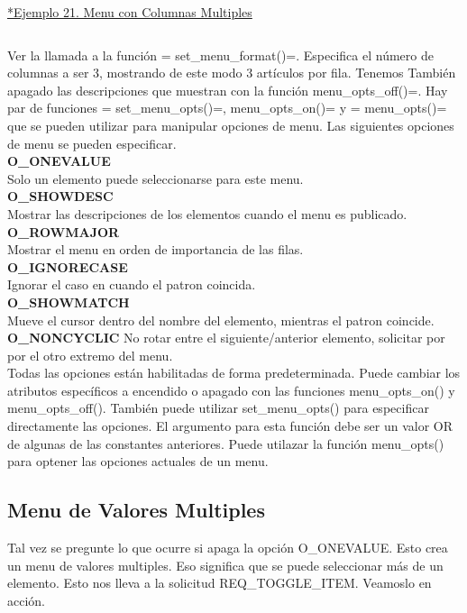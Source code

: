 \documentclass{article}
\begin{document}
\href{https://github.com/nasciiboy/NCURSES-Programming-HOWTO/blob/master/ncurses_programs/menus/menu_multi_column.c}{*Ejemplo 21. Menu con Columnas Multiples}
\inputminted{cpp}{./cpp/021_menu_columnas.cpp}

Ver la llamada a la función = set\_menu\_format()=. Especifica el número de
columnas a ser 3, mostrando de este modo 3 artículos por fila. Tenemos También
apagado las descripciones que muestran con la función menu\_opts\_off()=. Hay par
de funciones = set\_menu\_opts()=, menu\_opts\_on()= y = menu\_opts()= que se pueden
utilizar para manipular opciones de menu. Las siguientes opciones de menu se
pueden especificar.\\

\textbf{O\_ONEVALUE}\\
Solo un elemento puede seleccionarse para este menu.\\

\textbf{O\_SHOWDESC}\\
Mostrar las descripciones de los elementos cuando el menu es publicado.\\

\textbf{O\_ROWMAJOR}\\
Mostrar el menu en orden de importancia de las filas.\\

\textbf{O\_IGNORECASE}\\
Ignorar el caso en cuando el patron coincida.\\

\textbf{O\_SHOWMATCH}\\
Mueve el cursor dentro del nombre del elemento, mientras el patron coincide.\\

\textbf{O\_NONCYCLIC}
No rotar entre el siguiente/anterior elemento, solicitar por por el otro extremo del menu.\\

Todas las opciones están habilitadas de forma predeterminada. Puede cambiar los
atributos específicos a encendido o apagado con las funciones menu\_opts\_on() y
menu\_opts\_off(). También puede utilizar set\_menu\_opts() para especificar
directamente las opciones. El argumento para esta función debe ser un valor OR
de algunas de las constantes anteriores. Puede utilazar la función menu\_opts()
para optener las opciones actuales de un menu.

\subsection{Menu de Valores Multiples}%
Tal vez se pregunte lo que ocurre si apaga la opción O\_ONEVALUE. Esto crea un
menu de valores multiples. Eso significa que se puede seleccionar más de un
elemento. Esto nos lleva a la solicitud REQ\_TOGGLE\_ITEM. Veamoslo en acción.\\
\end{document}
